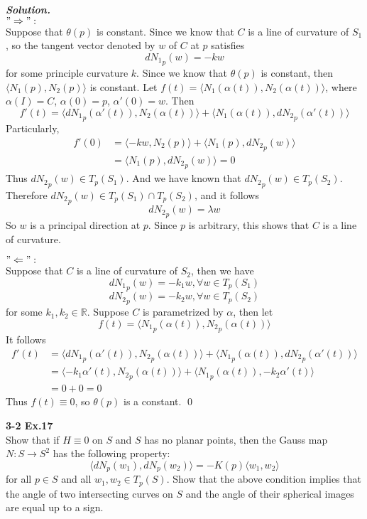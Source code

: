 \documentclass{article}
\begin{document}
\par
\textbf{\textit{Solution.}}\\
$"\Rightarrow":$\\
Suppose that $\theta(p)$ is constant.
Since we know that $C$ is a line of curvature of $S_1$, so the tangent
vector denoted by $w$ of $C$ at $p$ satisfies
$$
    d{N_1}_p(w) = -kw
$$
for some principle curvature $k$.
Since we know that $\theta(p)$ is constant, then $\langle N_1(p), N_2(p) \rangle$ 
is constant. 
Let $f(t) = \langle {N_1}(\alpha(t)), {N_2}(\alpha(t)) \rangle$,
where $\alpha(I) = C$, $\alpha(0) = p$, $\alpha'(0) = w$.
Then 
$$
    f'(t) = \langle d{N_1}_p(\alpha'(t)), {N_2}(\alpha(t)) \rangle + 
    \langle {N_1}(\alpha(t)), d{N_2}_p(\alpha'(t)) \rangle
$$
Particularly,
$$
\begin{aligned}
    f'(0) &= \langle -kw, {N_2}(p) \rangle + \langle {N_1}(p), d{N_2}_p(w) \rangle\\
    &= \langle N_1(p), d{N_2}_p(w)\rangle = 0
\end{aligned}
$$
Thus $d{N_2}_p(w) \in T_p(S_1)$. And we have known that $d{N_2}_p(w) \in T_p(S_2)$.
Therefore $d{N_2}_p(w) \in T_p(S_1) \cap T_p(S_2)$, and it follows
$$
    d{N_2}_p(w) = \lambda w
$$
So $w$ is a principal direction at $p$.
Since $p$ is arbitrary, this shows that $C$ is a line of curvature.

\par
$"\Leftarrow":$\\
Suppose that $C$ is a line of curvature of $S_2$, then we have
$$
    d{N_1}_p(w) = -k_1 w, \forall w \in T_p(S_1)
$$
$$
    d{N_2}_p(w) = -k_2 w, \forall w \in T_p(S_2)
$$
for some $k_1, k_2 \in \mathbb{R}$.
Suppose $C$ is parametrized by $\alpha$, then let
$$
    f(t) = \langle {N_1}_p(\alpha(t)), {N_2}_p(\alpha(t)) \rangle
$$
It follows
$$
\begin{aligned}
    f'(t) &= \langle d{N_1}_p(\alpha'(t)), {N_2}_p(\alpha(t)) \rangle
    + \langle {N_1}_p(\alpha(t)), d{N_2}_p(\alpha'(t)) \rangle \\
    &= \langle -k_1 \alpha'(t), {N_2}_p(\alpha(t)) \rangle
    + \langle {N_1}_p(\alpha(t)), -k_2 \alpha'(t) \rangle\\
    &= 0 + 0 = 0
\end{aligned}
$$
Thus $f(t) \equiv 0$, so $\theta(p)$ is a constant.
\qed


\par
\textbf{3-2 Ex.17}\\
Show that if $H \equiv 0$ on $S$ and $S$ has no planar points,
then the Gauss map $N: S \to S^2$ has the following property:
$$
    \langle dN_p(w_1), dN_p(w_2) \rangle = -K(p)\langle w_1, w_2 \rangle
$$
for all $p \in S$ and all $w_1,w_2 \in T_p(S)$. Show that the
above condition implies that the angle of two intersecting curves
on $S$ and the angle of their spherical images are equal up
to a sign.
\end{document}
